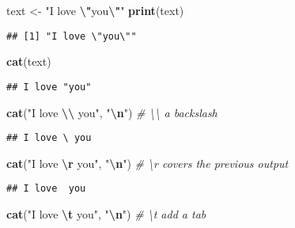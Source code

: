 \documentclass[
  12pt,
]{article}
\newenvironment{Shaded}{\begin{snugshade}}{\end{snugshade}}
\newcommand{\CommentTok}[1]{\textcolor[rgb]{0.56,0.35,0.01}{\textit{#1}}}
\newcommand{\FunctionTok}[1]{\textcolor[rgb]{0.13,0.29,0.53}{\textbf{#1}}}
\newcommand{\NormalTok}[1]{#1}
\newcommand{\OtherTok}[1]{\textcolor[rgb]{0.56,0.35,0.01}{#1}}
\newcommand{\SpecialCharTok}[1]{\textcolor[rgb]{0.81,0.36,0.00}{\textbf{#1}}}
\newcommand{\StringTok}[1]{\textcolor[rgb]{0.31,0.60,0.02}{#1}}
\begin{document}
\begin{Shaded}
\begin{Highlighting}[]
\NormalTok{text }\OtherTok{\textless{}{-}} \StringTok{"I love }\SpecialCharTok{\textbackslash{}"}\StringTok{you}\SpecialCharTok{\textbackslash{}"}\StringTok{"}
\FunctionTok{print}\NormalTok{(text)}
\end{Highlighting}
\end{Shaded}

\begin{verbatim}
## [1] "I love \"you\""
\end{verbatim}

\begin{Shaded}
\begin{Highlighting}[]
\FunctionTok{cat}\NormalTok{(text)}
\end{Highlighting}
\end{Shaded}

\begin{verbatim}
## I love "you"
\end{verbatim}

\begin{Shaded}
\begin{Highlighting}[]
\FunctionTok{cat}\NormalTok{(}\StringTok{"I love }\SpecialCharTok{\textbackslash{}\textbackslash{}}\StringTok{ you"}\NormalTok{, }\StringTok{"}\SpecialCharTok{\textbackslash{}n}\StringTok{"}\NormalTok{)  }\CommentTok{\# \textquotesingle{}\textbackslash{}\textbackslash{}\textquotesingle{} a backslash}
\end{Highlighting}
\end{Shaded}

\begin{verbatim}
## I love \ you
\end{verbatim}

\begin{Shaded}
\begin{Highlighting}[]
\FunctionTok{cat}\NormalTok{(}\StringTok{"I love }\SpecialCharTok{\textbackslash{}r}\StringTok{ you"}\NormalTok{, }\StringTok{"}\SpecialCharTok{\textbackslash{}n}\StringTok{"}\NormalTok{)  }\CommentTok{\# \textquotesingle{}\textbackslash{}r\textquotesingle{} covers the previous output}
\end{Highlighting}
\end{Shaded}

\begin{verbatim}
## I love  you
\end{verbatim}

\begin{Shaded}
\begin{Highlighting}[]
\FunctionTok{cat}\NormalTok{(}\StringTok{"I love }\SpecialCharTok{\textbackslash{}t}\StringTok{ you"}\NormalTok{, }\StringTok{"}\SpecialCharTok{\textbackslash{}n}\StringTok{"}\NormalTok{)  }\CommentTok{\# \textquotesingle{}\textbackslash{}t\textquotesingle{} add a tab}
\end{Highlighting}
\end{Shaded}
\end{document}
